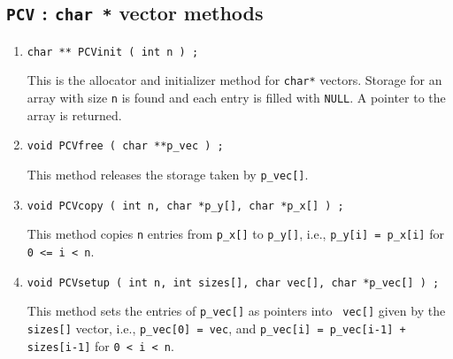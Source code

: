 \par
\subsection{{\tt PCV} : {\tt char *} vector methods}
\label{subsection:Utilities:proto:PCV}
\par
\begin{enumerate}
\item
\begin{verbatim}
char ** PCVinit ( int n ) ;
\end{verbatim}
This is the allocator and initializer method for {\tt char*} vectors.
Storage for an array with size {\tt n} is found and each
entry is filled with {\tt NULL}.
A pointer to the array is returned.
\item
\begin{verbatim}
void PCVfree ( char **p_vec ) ;
\end{verbatim}
This method releases the storage taken by {\tt p\_vec[]}.
\item
\begin{verbatim}
void PCVcopy ( int n, char *p_y[], char *p_x[] ) ;
\end{verbatim}
This method copies {\tt n} entries from {\tt p\_x[]} to {\tt p\_y[]},
i.e.,
{\tt p\_y[i] = p\_x[i]} for {\tt 0 <= i < n}.
\item
\begin{verbatim}
void PCVsetup ( int n, int sizes[], char vec[], char *p_vec[] ) ;
\end{verbatim}
This method sets the entries of {\tt p\_vec[]} as pointers into {\tt
vec[]} given by the {\tt sizes[]} vector,
i.e.,
{\tt p\_vec[0] = vec}, and 
{\tt p\_vec[i] = p\_vec[i-1] + sizes[i-1]} 
for {\tt 0 < i < n}.
\end{enumerate}
